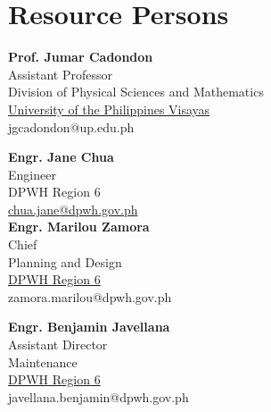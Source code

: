 %
%
%                 

\chapter{Resource Persons}
\label{sec:appendixb}

%
%
%
%

%
%

\newcommand{\resperson}[4]{\textbf{#1} \\ #2 \\ #3  \\ \url{#4}\vspace{0.5em}\\}

\resperson{Prof. Jumar Cadondon}{Assistant Professor}{Division of Physical Sciences and Mathematics} {University of the Philippines Visayas}{jgcadondon@up.edu.ph}

\resperson{Engr. Jane Chua}{Engineer}{DPWH Region 6}{chua.jane@dpwh.gov.ph}

\resperson{Engr. Marilou Zamora}{Chief}{Planning and Design}{DPWH Region 6}{zamora.marilou@dpwh.gov.ph}

\resperson{Engr. Benjamin Javellana}{Assistant Director}{Maintenance}{DPWH Region 6}{javellana.benjamin@dpwh.gov.ph}